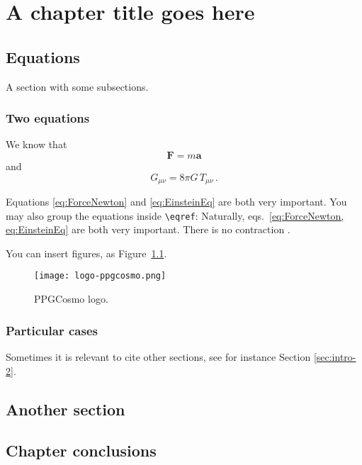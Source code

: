 \chapter{A chapter title goes here}





\section{Equations}
A section with some subsections.

\subsection{Two equations}

We know that 
\begin{equation}
	\boldsymbol{F} = m \boldsymbol{a}  \label{eq:ForceNewton}
\end{equation}
and
\begin{equation}
	G_{\mu \nu} = 8 \pi G  \, T_{\mu \nu} \, . \label{eq:EinsteinEq}
\end{equation}

Equations \eqref{eq:ForceNewton} and \eqref{eq:EinsteinEq} are both very important. You may also group the equations inside \verb!\eqref!: Naturally, eqs.~\eqref{eq:ForceNewton, eq:EinsteinEq} are both very important. There is no contraction \cite{Ade:2015xua, 0521857937, Abbott:2016blz}.

You can insert figures, as Figure~\ref{fig:ppgcosmologo}.

\begin{figure}[h]
 	\centering
	\texttt{[image: logo-ppgcosmo.png]}
	\caption{PPGCosmo logo.}
	\label{fig:ppgcosmologo}
\end{figure}

\subsection{Particular cases}
Sometimes it is relevant to cite other sections, see for instance Section \ref{sec:intro-2}.

\section{Another section}



\section{Chapter conclusions}

